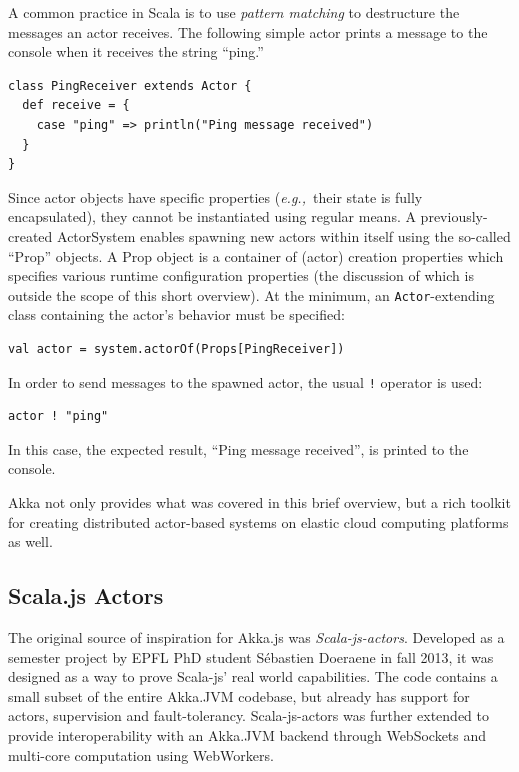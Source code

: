 \documentclass{sig-alternate}
\newcommand{\eg}{{\em e.g.,~}}
\begin{document}
A common practice in Scala is to use {\em pattern matching} to destructure the messages an actor receives. The following simple actor prints a message to the console when it receives the string ``ping.''
\begin{lstlisting}
class PingReceiver extends Actor {
  def receive = {
    case "ping" => println("Ping message received")
  }
}
\end{lstlisting}
\noindent
Since actor objects have specific properties (\eg their state is fully encapsulated), they cannot be instantiated using regular means. A previously-created ActorSystem enables spawning new actors within itself using the so-called ``Prop'' objects. A Prop object is a container of (actor) creation properties which specifies various runtime configuration properties (the discussion of which is outside the scope of this short overview). At the minimum, an \verb|Actor|-extending class containing the actor's behavior must be specified:
\begin{lstlisting}
val actor = system.actorOf(Props[PingReceiver])
\end{lstlisting}
\noindent
In order to send messages to the spawned actor, the usual \verb|!| operator is used:
\begin{lstlisting}
actor ! "ping"
\end{lstlisting}
\noindent
In this case, the expected result, ``Ping message received'', is printed to the console.

Akka not only provides what was covered in this brief overview, but a rich toolkit for creating distributed actor-based systems on elastic cloud computing platforms as well.


\subsection{Scala.js Actors}

The original source of inspiration for Akka.js was \textit{Scala-js-actors}.
Developed as a semester project by EPFL PhD student Sébastien Doeraene in fall 2013, it was designed as a way to prove Scala-js' real world capabilities.
The code contains a small subset of the entire Akka.JVM codebase, but already has support for actors, supervision and fault-tolerancy.
Scala-js-actors was further extended to provide interoperability with an Akka.JVM backend through WebSockets and multi-core computation using WebWorkers.
\end{document}
